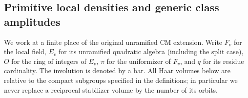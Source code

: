 \subsection{Primitive local densities and generic class amplitudes}
\label{sec:flag-generic-local-amplitude}

We work at a finite place of the original unramified CM extension.
Write \(F_v\) for the local field, \(E_v\) for its unramified quadratic
algebra (including the split case), \(O\) for the ring of integers
of \(E_v\), \(\pi\) for the uniformizer of \(F_v\), and \(q\) for
its residue cardinality. The involution is denoted by a bar.
All Haar volumes below are relative to the compact subgroups
specified in the definitions; in particular we never replace a
reciprocal stabilizer volume by the number of its orbits.

